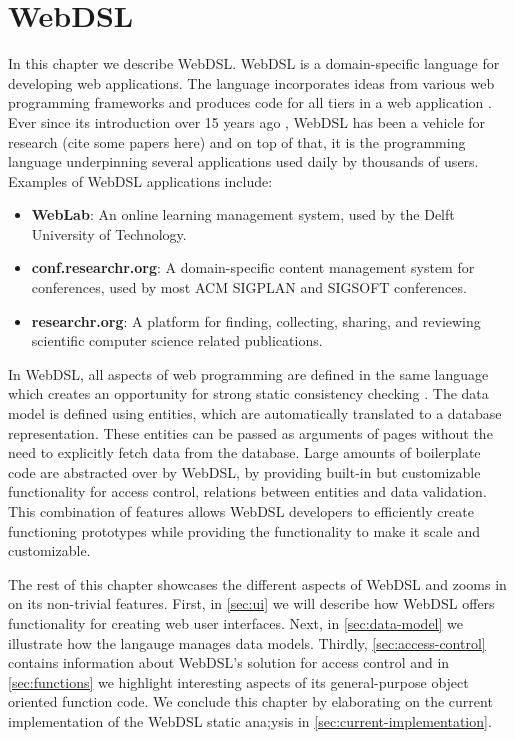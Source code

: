 
\chapter{\label{chap:webdsl}WebDSL}

  In this chapter we describe WebDSL. WebDSL is a domain-specific language for developing web applications. The language incorporates ideas from various web programming frameworks and produces code for all tiers in a web application \autocite{Groenewegen2020}. Ever since its introduction over 15 years ago \autocite{Visser2007}, WebDSL has been a vehicle for research (cite some papers here) and on top of that, it is the programming language underpinning several applications used daily by thousands of users. Examples of WebDSL applications include:

  \begin{itemize}
    \item \textbf{WebLab}: An online learning management system, used by the Delft University of Technology.
    \item \textbf{conf.researchr.org}: A domain-specific content management system for conferences, used by most ACM SIGPLAN and SIGSOFT conferences.
    \item \textbf{researchr.org}: A platform for finding, collecting, sharing, and reviewing scientific computer science related publications.
  \end{itemize}

  In WebDSL, all aspects of web programming are defined in the same language which creates an opportunity for strong static consistency checking \autocite{Hemel2011}. The data model is defined using entities, which are automatically translated to a database representation. These entities can be passed as arguments of pages without the need to explicitly fetch data from the database. Large amounts of boilerplate code are abstracted over by WebDSL, by providing built-in but customizable functionality for access control, relations between entities and data validation. This combination of features allows WebDSL developers to efficiently create functioning prototypes while providing the functionality to make it scale and customizable.

  The rest of this chapter showcases the different aspects of WebDSL and zooms in on its non-trivial features. First, in \cref{sec:ui} we will describe how WebDSL offers functionality for creating web user interfaces. Next, in \cref{sec:data-model} we illustrate how the langauge manages data models. Thirdly, \cref{sec:access-control} contains information about WebDSL's solution for access control and in \cref{sec:functions} we highlight interesting aspects of its general-purpose object oriented function code. We conclude this chapter by elaborating on the current implementation of the WebDSL static ana;ysis in \cref{sec:current-implementation}.

